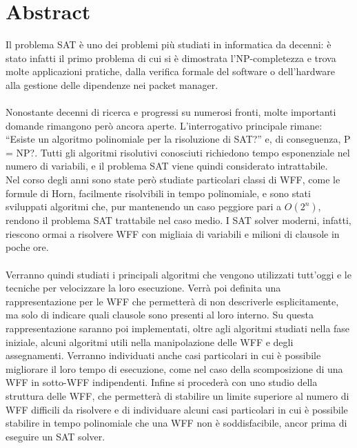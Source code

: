 \chapter{Abstract}
Il problema SAT è uno dei problemi più studiati in informatica da decenni: è stato infatti il primo problema di cui si è dimostrata l'NP-completezza e trova molte applicazioni pratiche, dalla verifica formale del software o dell'hardware alla gestione delle dipendenze nei packet manager.\\
\\
Nonostante decenni di ricerca e progressi su numerosi fronti, molte importanti domande rimangono però ancora aperte. L'interrogativo principale rimane: “Esiste un algoritmo polinomiale per la risoluzione di SAT?” e, di conseguenza, P = NP?.
Tutti gli algoritmi risolutivi conosciuti richiedono tempo esponenziale nel numero di variabili, e il problema SAT viene quindi considerato intrattabile.\\
Nel corso degli anni sono state però studiate particolari classi di WFF, come le formule di Horn, facilmente risolvibili in tempo polinomiale, e sono stati sviluppati algoritmi che, pur mantenendo un caso peggiore pari a $O(2^n)$, rendono il problema SAT trattabile nel caso medio. I SAT solver moderni, infatti, riescono ormai a risolvere WFF con migliaia di variabili e milioni di clausole in poche ore.\\
\\
Verranno quindi studiati i principali algoritmi che vengono utilizzati tutt'oggi e le tecniche per velocizzare la loro esecuzione.
Verrà poi definita una rappresentazione per le WFF che permetterà di non descriverle esplicitamente, ma solo di indicare quali clausole sono presenti al loro interno. Su questa rappresentazione saranno poi implementati, oltre agli algoritmi studiati nella fase iniziale, alcuni algoritmi utili nella manipolazione delle WFF e degli assegnamenti. Verranno individuati anche casi particolari in cui è possibile migliorare il loro tempo di esecuzione, come nel caso della scomposizione di una WFF in sotto-WFF indipendenti.
Infine si procederà con uno studio della struttura delle WFF, che permetterà di stabilire un limite superiore al numero di WFF difficili da risolvere e di individuare alcuni casi particolari in cui è possibile stabilire in tempo polinomiale che una WFF non è soddisfacibile, ancor prima di eseguire un SAT solver.